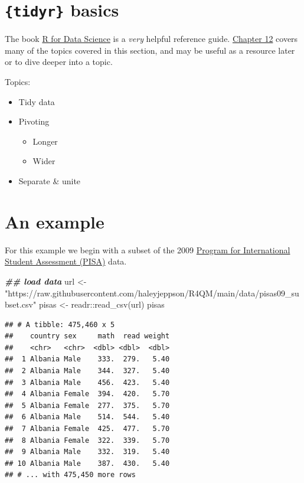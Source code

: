 \documentclass[
]{book}
\newenvironment{Shaded}{\begin{snugshade}}{\end{snugshade}}
\newcommand{\DocumentationTok}[1]{\textcolor[rgb]{0.56,0.35,0.01}{\textbf{\textit{#1}}}}
\newcommand{\FunctionTok}[1]{\textcolor[rgb]{0.00,0.00,0.00}{#1}}
\newcommand{\NormalTok}[1]{#1}
\newcommand{\OtherTok}[1]{\textcolor[rgb]{0.56,0.35,0.01}{#1}}
\newcommand{\SpecialCharTok}[1]{\textcolor[rgb]{0.00,0.00,0.00}{#1}}
\newcommand{\StringTok}[1]{\textcolor[rgb]{0.31,0.60,0.02}{#1}}
\providecommand{\tightlist}{%
  \setlength{\itemsep}{0pt}\setlength{\parskip}{0pt}}
\begin{document}
\hypertarget{tidyr-basics}{%
\section*{\texorpdfstring{\texttt{\{tidyr\}} basics}{\{tidyr\} basics}}\label{tidyr-basics}}

The book \href{https://r4ds.had.co.nz/}{R for Data Science} is a \emph{very} helpful reference guide. \href{https://r4ds.had.co.nz/tidy-data.html}{Chapter 12} covers many of the topics covered in this section, and may be useful as a resource later or to dive deeper into a topic.

Topics:

\begin{itemize}
\tightlist
\item
  Tidy data
\item
  Pivoting

  \begin{itemize}
  \tightlist
  \item
    Longer
  \item
    Wider
  \end{itemize}
\item
  Separate \& unite
\end{itemize}

\hypertarget{an-example-2}{%
\section{An example}\label{an-example-2}}

For this example we begin with a subset of the 2009 \href{https://nces.ed.gov/surveys/pisa/}{Program for International Student Assessment (PISA)} data.

\begin{Shaded}
\begin{Highlighting}[]
\DocumentationTok{\#\# load data}
\NormalTok{url }\OtherTok{\textless{}{-}} \StringTok{"https://raw.githubusercontent.com/haleyjeppson/R4QM/main/data/pisas09\_subset.csv"}
\NormalTok{pisas }\OtherTok{\textless{}{-}}\NormalTok{ readr}\SpecialCharTok{::}\FunctionTok{read\_csv}\NormalTok{(url)}
\NormalTok{pisas}
\end{Highlighting}
\end{Shaded}

\begin{verbatim}
## # A tibble: 475,460 x 5
##    country sex     math  read weight
##    <chr>   <chr>  <dbl> <dbl>  <dbl>
##  1 Albania Male    333.  279.   5.40
##  2 Albania Male    344.  327.   5.40
##  3 Albania Male    456.  423.   5.40
##  4 Albania Female  394.  420.   5.70
##  5 Albania Female  277.  375.   5.70
##  6 Albania Male    514.  544.   5.40
##  7 Albania Female  425.  477.   5.70
##  8 Albania Female  322.  339.   5.70
##  9 Albania Male    332.  319.   5.40
## 10 Albania Male    387.  430.   5.40
## # ... with 475,450 more rows
\end{verbatim}
\end{document}
